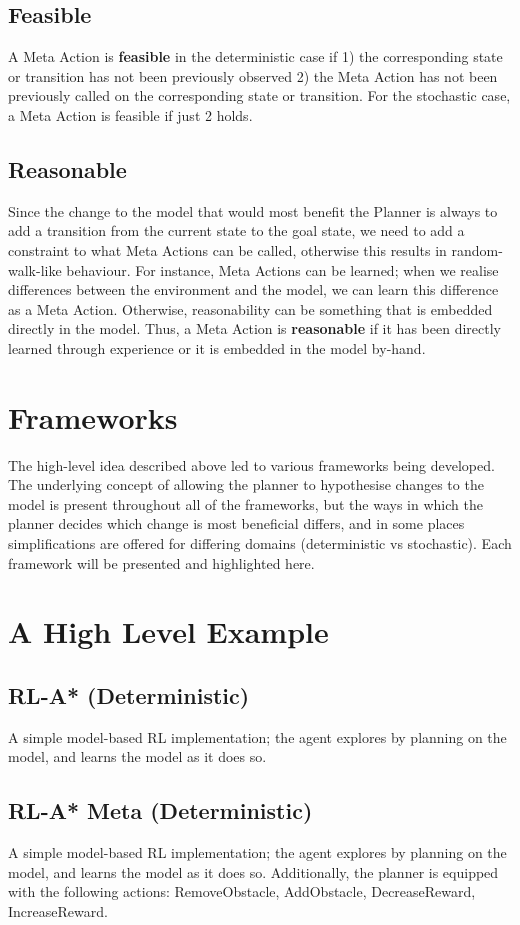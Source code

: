 \subsection{Feasible}
A Meta Action is \textbf{feasible} in the deterministic case if 1) the corresponding state or transition has not been previously observed 2) the Meta Action has not been previously called on the corresponding state or transition. For the stochastic case, a Meta Action is feasible if just 2 holds.
\subsection{Reasonable}
Since the change to the model that would most benefit the Planner is always to add a transition from the current state to the goal state, we need to add a constraint to what Meta Actions can be called, otherwise this results in random-walk-like behaviour.
For instance, Meta Actions can be learned; when we realise differences between the environment and the model, we can learn this difference as a Meta Action. Otherwise, reasonability can be something that is embedded directly in the model. Thus, a Meta Action is \textbf{reasonable} if it has been directly learned through experience or it is embedded in the model by-hand.
\section{Frameworks}
The high-level idea described above led to various frameworks being developed. The underlying concept of allowing the planner to hypothesise changes to the model is present throughout all of the frameworks, but the ways in which the planner decides which change is most beneficial differs, and in some places simplifications are offered for differing domains (deterministic vs stochastic). Each framework will be presented and highlighted here.
\section{A High Level Example}
\subsection{RL-A* (Deterministic)}
A simple model-based RL implementation; the agent explores by planning on the model, and learns the model as it does so.
\subsection{RL-A* Meta (Deterministic)}
A simple model-based RL implementation; the agent explores by planning on the model, and learns the model as it does so.
Additionally, the planner is equipped with the following actions: RemoveObstacle, AddObstacle, DecreaseReward, IncreaseReward.
